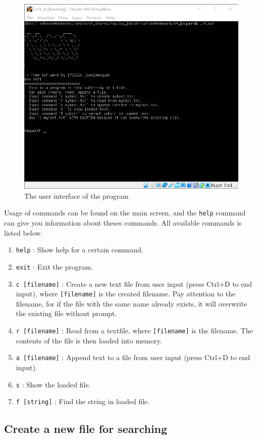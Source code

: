 \documentclass[cn,black,12pt,normal]{elegantnote}
\begin{document}
\begin{figure}[H]
    \centering
    \includegraphics[width=0.6\linewidth]{image/kmp_01.jpg}
    \caption{The user interface of the program}
\end{figure}

Usage of commands can be found on the main screen, and the \lstinline{help} command can give you information about theses commands.  All available commands is listed below.

\begin{enumerate}
    \item \lstinline{help} : Show help for a certain command.
    \item \lstinline{exit} : Exit the program.
    \item \lstinline{c [filename]} : Create a new text file from user input (press Ctrl+D to end input), where \lstinline{[filename]} is the created filename. Pay attention to the filename, for if the file with the same name already exists, it will overwrite the existing file without prompt.
    \item \lstinline{r [filename]} : Read from a textfile, where \lstinline{[filename]} is the filename. The contents of the file is then loaded into memory.
    \item \lstinline{a [filename]} : Append text to a file from user input (press Ctrl+D to end input).
    \item \lstinline{s} : Show the loaded file.
    \item \lstinline{f [string]} : Find the string in loaded file.
\end{enumerate}

\subsection{Create a new file for searching}
\end{document}
